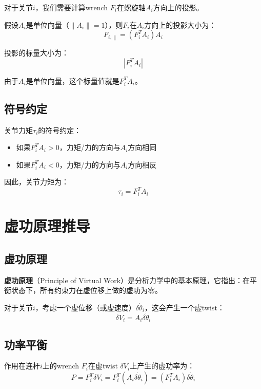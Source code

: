 \documentclass[12pt,a4paper]{article}
\begin{document}
对于关节$i$，我们需要计算wrench $F_i$在螺旋轴$A_i$方向上的投影。

假设$A_i$是单位向量（$\|A_i\| = 1$），则$F_i$在$A_i$方向上的投影大小为：
\begin{equation}
F_{i,\parallel} = (F_i^T A_i) A_i
\end{equation}

投影的标量大小为：
\begin{equation}
|F_i^T A_i|
\end{equation}

由于$A_i$是单位向量，这个标量值就是$F_i^T A_i$。

\subsection{符号约定}

关节力矩$\tau_i$的符号约定：
\begin{itemize}
\item 如果$F_i^T A_i > 0$，力矩/力的方向与$A_i$方向相同
\item 如果$F_i^T A_i < 0$，力矩/力的方向与$A_i$方向相反
\end{itemize}

因此，关节力矩为：
\begin{equation}
\tau_i = F_i^T A_i
\label{eq:torque_projection}
\end{equation}

\section{虚功原理推导}

\subsection{虚功原理}

\textbf{虚功原理}（Principle of Virtual Work）是分析力学中的基本原理，它指出：在平衡状态下，所有约束力在虚位移上做的虚功为零。

对于关节$i$，考虑一个虚位移（或虚速度）$\delta \dot{\theta}_i$，这会产生一个虚twist：
\begin{equation}
\delta V_i = A_i \delta \dot{\theta}_i
\end{equation}

\subsection{功率平衡}

作用在连杆$i$上的wrench $F_i$在虚twist $\delta V_i$上产生的虚功率为：
\begin{equation}
P = F_i^T \delta V_i = F_i^T (A_i \delta \dot{\theta}_i) = (F_i^T A_i) \delta \dot{\theta}_i
\end{equation}
\end{document}
